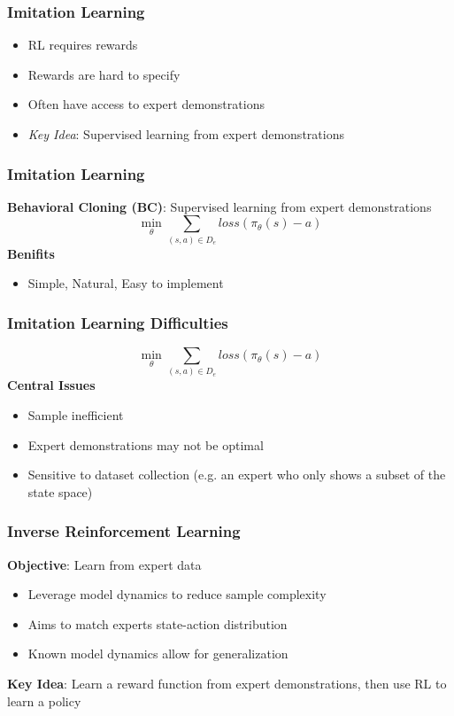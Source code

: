 \documentclass{beamer}
\begin{document}
\begin{frame}
\frametitle{Imitation Learning}
	\begin{itemize}
		\item RL requires rewards
		\vfill
		\item Rewards are hard to specify
		\vfill
		\item Often have access to expert demonstrations
		\vfill
		\item \emph{Key Idea}: Supervised learning from expert demonstrations
	\end{itemize}
\end{frame}

\begin{frame}
\frametitle{Imitation Learning}
	\textbf{Behavioral Cloning (BC)}: Supervised learning from expert demonstrations
	\[ 
		\min_{\theta} \sum_{(s,a) \in D_e} loss \left(\pi_\theta(s) - a \right)
	\]
	\vfill
	\textbf{Benifits}
	\begin{itemize}
		\item Simple, Natural, Easy to implement
	\end{itemize}
\end{frame}

\begin{frame}
	\frametitle{Imitation Learning Difficulties}
	\[ 
		\min_{\theta} \sum_{(s,a) \in D_e} loss \left(\pi_\theta(s) - a \right)
	\]
	\vfill
	\textbf{Central Issues}
	\begin{itemize}
		\item Sample inefficient
		\item Expert demonstrations may not be optimal
		\item Sensitive to dataset collection (e.g. an expert who only shows a subset of the state space)
	\end{itemize}
\end{frame}

\begin{frame}
	\frametitle{Inverse Reinforcement Learning}
	\textbf{Objective}: Learn from expert data
	\begin{itemize}
		\item Leverage model dynamics to reduce sample complexity
		\item Aims to match experts state-action distribution
		\item Known model dynamics allow for generalization
	\end{itemize}
	\vfill
	\textbf{Key Idea}: Learn a reward function from expert demonstrations, then use RL to learn a policy
\end{frame}
\end{document}
